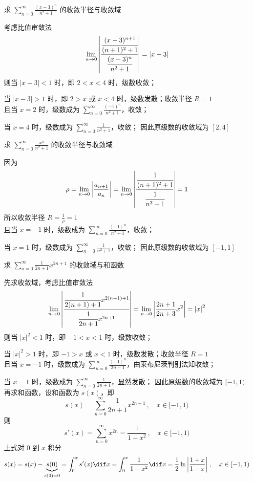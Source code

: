 \documentclass[color=green,titlestyle=hang]{elegantbook}%
\begin{document}
\begin{example}
求 $\sum_{n=0}^{\infty}\frac{(x-3)^n}{n^2+1}$ 的收敛半径与收敛域	
\end{example}\begin{Solution}考虑比值审敛法
\[\lim_{n\to0}\left|\cfrac{\cfrac{(x-3)^{n+1}}{(n+1)^2+1}}{\cfrac{(x-3)^n}{n^2+1}}\right|=|x-3|\]
则当 $|x-3|<1$ 时，即 $2<x<4$ 时，级数收敛；
\par\setlength{\parindent}{1em}当 $\left|x-3\right|>1$ 时，即 $2>x$ 或 $x<4$ 时，级数发散；{\color{red}收敛半径 $R=1$}\\
且当  $x=2$ 时，级数成为 $\sum_{n=0}^{\infty}\frac{(-1)^n}{n^2+1}$，收敛；\\
\par 当  $x=4$ 时，级数成为 $\sum_{n=0}^{\infty}\frac{1}{n^2+1}$，收敛；
因此原级数的{\color{red}收敛域为 $[2,4]$}	
\end{Solution}

\begin{example}
求 $\sum_{n=0}^{\infty}\frac{x^n}{n^2+1}$ 的收敛半径与收敛域
\end{example}\begin{Solution}因为
\[\rho=\lim_{n\to0}\left|\frac{a_{n+1}}{a_n}\right|=\lim_{n\to0}\left|\cfrac{\cfrac{1}{(n+1)^2+1}}{\cfrac{1}{n^2+1}}\right|=1\]
所以{\color{red}收敛半径 $R=\frac{1}{\rho}=1$}\\
且当  $x=-1$ 时，级数成为 $\sum_{n=0}^{\infty}\frac{(-1)^n}{n^2+1}$，收敛；\\
\par\setlength{\parindent}{1em}当  $x=1$ 时，级数成为 $\sum_{n=0}^{\infty}\frac{1}{n^2+1}$，收敛；
因此原级数的{\color{red}收敛域为 $[-1,1]$}	
\end{Solution}

\begin{example}
求 $\sum_{n=0}^{\infty}\frac{1}{2n+1}x^{2n+1}$ 的收敛域与和函数
\end{example}\begin{Solution}先求收敛域，考虑比值审敛法
\[\lim_{n\to0}\left|\cfrac{\cfrac{1}{2(n+1)+1}x^{2(n+1)+1}}{\cfrac{1}{2n+1}x^{2n+1}}\right|=\lim_{n\to0}\left|\frac{2n+1}{2n+3}x^2\right|=\left|x\right|^2\]
则当 $\left|x\right|^2<1$ 时，即 $-1<x<1$ 时，级数收敛；\\
\par\setlength{\parindent}{1em}当 $\left|x\right|^2>1$ 时，即 $-1>x$ 或 $x<1$ 时，级数发散；{\color{blue}收敛半径 $R=1$}\\
且当  $x=-1$ 时，级数成为 $\sum_{n=0}^{\infty}\frac{(-1)^n}{2n+1}$，由莱布尼茨判别法知收敛；\\
\par 当  $x=1$ 时，级数成为 $\sum_{n=0}^{\infty}\frac{1}{2n+1}$，显然发散；
因此原级数的{\color{red}收敛域为 $[-1,1)$}\\
再求和函数，设和函数为 $s(x)$，即
\[s(x)=\sum_{n=0}^{\infty}\frac{1}{2n+1}x^{2n+1}\,,\quad x\in[-1,1)\]
则 \[s'(x)=\sum_{n=0}^{\infty}x^{2n}=\frac{1}{1-x^2}\,,\quad x\in[-1,1)\]
上式对 $0$ 到 $x$ 积分
\[s(x)=s(x)-\underbrace{s(0)}\limits_{s(0)=0}=\int_{0}^{x}s'(x)\dif x=\int_{0}^{x}\frac{1}{1-x^2}\dif x=\frac{1}{2}\ln\left|\frac{1+x}{1-x}\right|\,,\quad x\in[-1,1)\]	
\end{Solution}
\end{document}
